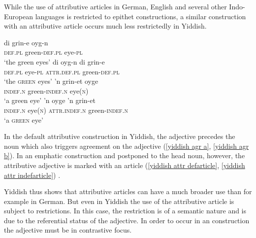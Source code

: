 While the use of attributive articles in German, English and several other Indo-European languages is restricted to epithet constructions, a similar construction with an attributive article occurs much less restrictedly in Yiddish.
\begin{exe}
\ex
\label{yiddish attr appos}
\begin{xlist}
\ex
\label{yiddish agr a}
\gll 	di grin-e oyg-n\\
	\textsc{def.pl}	green-\textsc{def.pl} eye-\textsc{pl}\\
\glt	‘the green eyes’
\ex
\label{yiddish attr defarticle}
\gll 	di oyg-n di grin-e\\
	\textsc{def.pl} eye-\textsc{pl} \textsc{attr.def.pl} green-\textsc{def.pl}\\
\glt	‘the \textsc{green} eyes’
\ex
\label{yiddish agr b}
\gll	'n grin-et oyge\\
	\textsc{indef.n} green-\textsc{indef.n} eye(\textsc{n})\\
\glt	‘a green eye’
\ex
\label{yiddish attr indefarticle}
\gll	'n oyge 'n grin-et\\
	\textsc{indef.n} eye(\textsc{n}) \textsc{attr.indef.n} green-\textsc{indef.n}\\
\glt	‘a \textsc{green} eye’
\end{xlist}
\end{exe}
In the default attributive construction in Yiddish, the adjective precedes the noun which also triggers agreement on the adjective (\ref{yiddish agr a}, \ref{yiddish agr b}). In an emphatic construction and postponed to the head noun, however, the attributive adjective is marked with an article (\ref{yiddish attr defarticle}, \ref{yiddish attr indefarticle}) \citep[342–347]{plank2003}.

Yiddish thus shows that attributive articles can have a much broader use than for example in German. But even in Yiddish the use of the attributive article is subject to restrictions. In this case, the restriction is of a semantic nature and is due to the referential status of the adjective. In order to occur in an  construction the adjective must be in contrastive focus.

